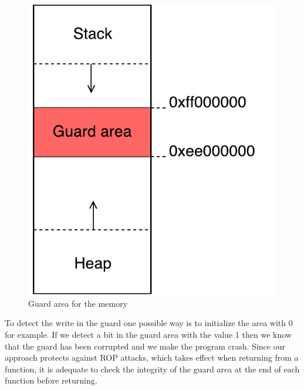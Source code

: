 \documentclass[11pt]{sdm}
\begin{document}
\begin{figure}[!ht]
\centering
\includegraphics[scale=0.6]{images/guard.pdf}
\caption{Guard area for the memory}
\label{guard}
\end{figure}

To detect the write in the guard one possible way is to initialize the area with 0 for example. If we detect a bit in the guard area with the value 1 then we know that the guard has been corrupted and we make the program crash. Since our approach protects against ROP attacks, which takes effect when returning from a function, it is adequate to check the integrity of the guard area at the end of each function before returning.
\end{document}
